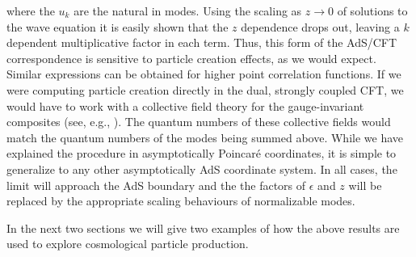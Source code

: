 \documentclass[a4paper,aps,prd,preprintnumbers,groupedaddress]{revtex4}
\begin{document}
where the $u_k$ are the natural in modes.  Using the scaling as $z \rightarrow 0$ of solutions to the wave equation it is easily shown that
the $z$ dependence drops out, leaving a $k$ dependent multiplicative factor in each term. Thus, this form of the AdS/CFT correspondence is
sensitive to particle creation effects, as we would expect. Similar expressions can be obtained for higher point correlation functions.  If we were computing particle creation directly in the dual, strongly coupled
CFT, we would have to work with a collective field theory for the gauge-invariant composites (see, e.g., \cite{vijay99}). The quantum
numbers of these collective fields would match the quantum numbers of the modes being summed above.   While we have explained the procedure
in asymptotically Poincar\'{e} coordinates, it is simple to generalize to any other asymptotically AdS coordinate system.   In all cases,
the limit will approach the AdS boundary and the the factors of $\epsilon$ and $z$ will be replaced by the appropriate scaling behaviours of
normalizable modes.

In the next two sections we will give two examples of how the above results are used to explore cosmological particle production.
\end{document}
